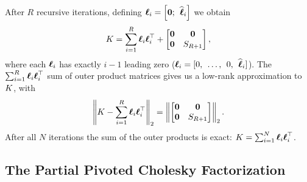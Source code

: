 %
After $R$ recursive iterations, defining $\boldsymbol{\ell}_{i} = \left[ \mathbf{0}; \:\: \widehat {\boldsymbol{\ell}}_i \right]$ we obtain
%
\begin{align}
  K  = \sum_{i=1}^{R} {\boldsymbol{\ell}}_{i} {\boldsymbol{\ell}}_{i}^{\top} + \begin{bmatrix} \mathbf{0} & \mathbf{0} \\ \mathbf{0} & S_{R+1} \end{bmatrix},
  \label{eqn:chol_low_rank}
\end{align}
%
where each $\boldsymbol{\ell}_i$ has exactly $i-1$ leading zero ($\boldsymbol{\ell}_i = [0, \:\: \ldots, \:\: 0, \:\: \widehat {\boldsymbol{\ell}}_i]$).
The $\sum_{i=1}^R \boldsymbol{\ell}_i \boldsymbol{\ell}_i^\top$ sum of outer product matrices gives us a low-rank approximation to $K$, with
\begin{equation}
  \left\Vert K - \sum_{i=1}^{R}{\boldsymbol{\ell}}_{i}{\boldsymbol{\ell}}_{i}^{\top} \right\Vert_{2} = \left\Vert \begin{bmatrix} \mathbf{0} & \mathbf{0} \\ \mathbf{0} & S_{R+1} \end{bmatrix} \right\Vert_2.
\end{equation}
After all $N$ iterations the sum of the outer products is exact: $K = \sum_{i=1}^N \boldsymbol{\ell}_i \boldsymbol{\ell}_i^\top$.


\subsection{The Partial Pivoted Cholesky Factorization}
\label{sec:piv_chol}

